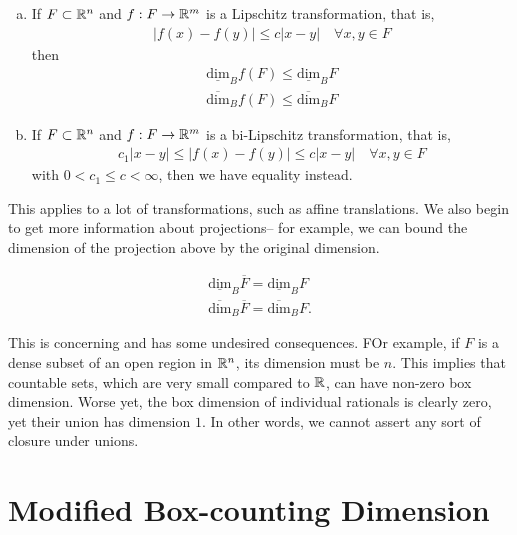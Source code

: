 \documentclass{memoir}
\begin{document}
\begin{prop}
	\begin{enumerate}[(a).]
		\item If \(F\subset \mathbb{R}^{n}\) and \(f:F\to \mathbb{R}^{m}\) is a Lipschitz transformation, that is,
			\begin{align*}
				\left| f(x) - f(y) \right| \leq c \left| x-y \right| \quad \forall x,y \in F
			\end{align*}
			then
			\begin{align*}
				\underline{ \textrm{dim}}_Bf(F) \leq \underline{ \textrm{dim}}_BF\\
				\overline{ \textrm{dim}}_B f(F) \leq \overline{ \textrm{dim}}_B F
			\end{align*}
		\item If \(F\subset \mathbb{R}^{n}\) and \(f:F\to \mathbb{R}^{m}\) is a bi-Lipschitz transformation, that is,
			\begin{align*}
				c_1 \left| x-y \right| \leq \left| f(x) - f(y) \right| \leq c \left| x-y \right| \quad \forall x,y \in F
			\end{align*}
			with \(0<c_1\leq c<\infty\), then we have equality instead.
	\end{enumerate}
\end{prop}
This applies to a lot of transformations, such as affine translations. We also begin to get more information about projections-- for example, we can bound the dimension of the projection above by the original dimension.

\begin{prop}
	\begin{align*}
		\underline{ \textrm{dim}}_B \overline{F} = \underline{ \textrm{dim}}_B F\\
		\overline{ \textrm{dim}}_B \overline{F} = \overline{ \textrm{dim}}_B F.
	\end{align*}
\end{prop}
This is concerning and has some undesired consequences. FOr example, if \(F\) is a dense subset of an open region in \(\mathbb{R}^{n}\), its dimension must be \(n\). This implies that countable sets, which are very small compared to \(\mathbb{R}\), can have non-zero box dimension. Worse yet, the box dimension of individual rationals is clearly zero, yet their union has dimension \(1\). In other words, we cannot assert any sort of closure under unions.

\section{Modified Box-counting Dimension}
\label{sec:modified_box_counting_dimension}
\end{document}
